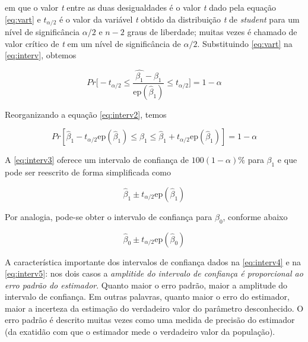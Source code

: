 \noindent em que o valor \textit{t} entre as duas desigualdades é o valor \textit{t} dado pela equação \autoref{eq:vart} e $t_{\alpha/2}$ é o valor da variável \textit{t} obtido da distribuição \textit{t} de \textit{student} para um nível de significância $\alpha/2$ e $n-2$ graus de liberdade; muitas vezes é chamado de valor crítico de \textit{t} em um nível de significância de $\alpha/2$. Substituindo \autoref{eq:vart} na \autoref{eq:interv}, obtemos

\begin{equation}
\label{eq:interv2}
    Pr\bigg[-t_{\alpha/2} \leq \dfrac{\hat{\beta_1} - \beta_1}{\text{ep}(\hat{\beta}_1)} \leq t_{\alpha/2}\bigg] = 1 - \alpha
\end{equation}

\noindent Reorganizando a equação \autoref{eq:interv2}, temos

\begin{equation}
\label{eq:interv3}
    Pr[\hat{\beta}_1 - t_{\alpha/2}\text{ep}(\hat{\beta}_1) \leq \beta_1 \leq \hat{\beta}_1 + t_{\alpha/2}\text{ep}(\hat{\beta}_1)] = 1-\alpha
\end{equation}

\noindent A \autoref{eq:interv3} oferece um intervalo de confiança de $100(1-\alpha)\%$ para $\beta_1$ e que pode ser reescrito de forma simplificada como

\begin{equation}
\label{eq:interv4}
    \hat{\beta}_1 \pm t_{\alpha/2}\text{ep}(\hat{\beta}_1)
\end{equation}

\noindent Por analogia, pode-se obter o intervalo de confiança para $\beta_0$, conforme abaixo

\begin{equation}
\label{eq:interv5}
    \hat{\beta}_0 \pm t_{\alpha/2}\text{ep}(\hat{\beta}_0)
\end{equation}

\noindent A característica importante dos intervalos de confiança dados na \autoref{eq:interv4} e na \autoref{eq:interv5}: nos dois casos a \textit{amplitide do intervalo de confiança é proporcional ao erro padrão do estimador}. Quanto maior o erro padrão, maior a amplitude do intervalo de confiança. Em outras palavras, quanto maior o erro do estimador, maior a incerteza da estimação do verdadeiro valor do parâmetro desconhecido. O erro padrão é descrito muitas vezes como uma medida de precisão do estimador (da exatidão com que o estimador mede o verdadeiro valor da população).


